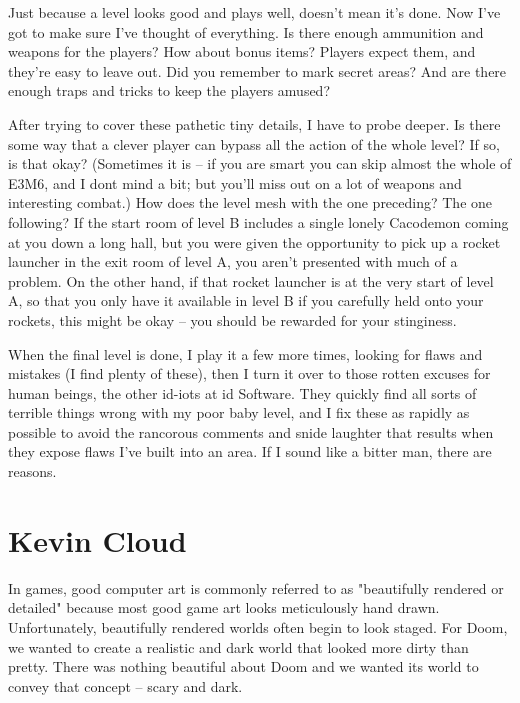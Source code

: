     Just because a level looks good and plays well, doesn't mean it's done. Now I've got to make sure I've thought of everything. Is there enough ammunition and weapons for the players? How about bonus items? Players expect them, and they're easy to leave out. Did you remember to mark secret areas? And are there enough traps and tricks to keep the players amused?\\
    \par
     After trying to cover these pathetic tiny details, I have to probe deeper. Is there some way that a clever player can bypass all the action of the whole level? If so, is that okay? (Sometimes it is -- if you are smart you can skip almost the whole of E3M6, and I dont mind a bit; but you'll miss out on a lot of weapons and interesting combat.) How does the level mesh with the one preceding? The one following? If the start room of level B includes a single lonely Cacodemon coming at you down a long hall, but you were given the opportunity to pick up a rocket launcher in the exit room of level A, you aren't presented with much of a problem. On the other hand, if that rocket launcher is at the very start of level A, so that you only have it available in level B if you carefully held onto your rockets, this might be okay -- you should be rewarded for your stinginess.\\
     \par
      When the final level is done, I play it a few more times, looking for flaws and mistakes (I find plenty of these), then I turn it over to those rotten excuses for human beings, the other id-iots at id Software. They quickly find all sorts of terrible things wrong with my poor baby level, and I fix these as rapidly as possible to avoid the rancorous comments and snide laughter that results when they expose flaws I've built into an area. If I sound like a bitter man, there are reasons.



\section{Kevin Cloud}

In games, good computer art is commonly referred to as "beautifully rendered or detailed" because most good game art looks meticulously hand drawn. Unfortunately, beautifully rendered worlds often begin to look staged. For Doom, we wanted to create a realistic and dark world that looked more dirty than pretty. There was nothing beautiful about Doom and we wanted its world to convey that concept -- scary and dark.\\
\par

